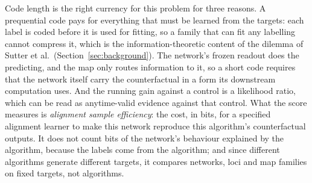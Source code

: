 \documentclass[11pt,a4paper]{article}
\begin{document}
Code length is the right currency for this problem for three reasons. A prequential code pays for everything that must be learned from the targets: each label is coded before it is used for fitting, so a family that can fit any labelling cannot compress it, which is the information-theoretic content of the dilemma of Sutter et al.\ (Section~\ref{sec:background}). The network's frozen readout does the predicting, and the map only routes information to it, so a short code requires that the network itself carry the counterfactual in a form its downstream computation uses. And the running gain against a control is a likelihood ratio, which can be read as anytime-valid evidence against that control. What the score measures is \emph{alignment sample efficiency}: the cost, in bits, for a specified alignment learner to make this network reproduce this algorithm's counterfactual outputs. It does not count bits of the network's behaviour explained by the algorithm, because the labels come from the algorithm; and since different algorithms generate different targets, it compares networks, loci and map families on fixed targets, not algorithms.
\end{document}
